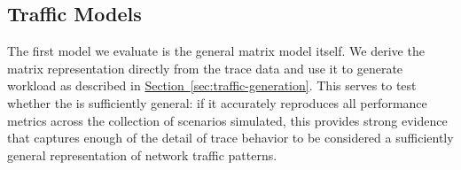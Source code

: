 \documentclass[twocolumn,final]{svjour3}
\newcommand{\caps}[1]{{\smaller{#1}}}
\newcommand{\Section}[1]{\hyperref[sec:#1]{Section~\ref*{sec:#1}}}
\begin{document}



\subsection{Traffic Models}
\label{sec:traffic-models}

The first model we evaluate is the general matrix model itself. We derive the matrix representation directly from the trace data and use it to generate workload as described in \Section{traffic-generation}. This serves to test whether the \caps{GMM} is sufficiently general: if it accurately reproduces all performance metrics across the collection of scenarios simulated, this provides strong evidence that \caps{GMM} captures enough of the detail of trace behavior to be considered a sufficiently general representation of network traffic patterns. %
\end{document}
